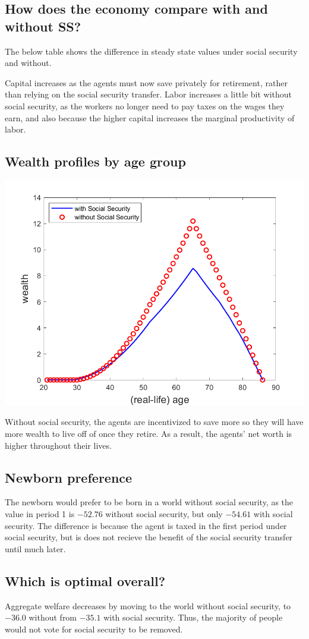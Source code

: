 \documentclass[11pt]{article} %
\begin{document}
\subsection{How does the economy compare with and without SS?}

The below table shows the difference in steady state values under social security and without.
\begin{center}

\end{center}

Capital increases as the agents must now save privately for retirement, rather than relying on the social security transfer. Labor increases a little bit without social security, as the workers no longer need to pay taxes on the wages they earn, and also because the higher capital increases the marginal productivity of labor.

\subsection{Wealth profiles by age group}

\includegraphics{fig3}

Without social security, the agents are incentivized to save more so they will have more wealth to live off of once they retire. As a result, the agents' net worth is higher throughout their lives.

\subsection{Newborn preference}
The newborn would prefer to be born in a world without social security, as the value in period 1 is $-52.76$ without social security, but only $-54.61$ with social security. The difference is because the agent is taxed in the first period under social security, but is does not recieve the benefit of the social security transfer until much later.

\subsection{Which is optimal overall?}
Aggregate welfare decreases by moving to the world without social security, to $-36.0$ without from $-35.1$ with social security. Thus, the majority of people would not vote for social security to be removed.
\end{document}
